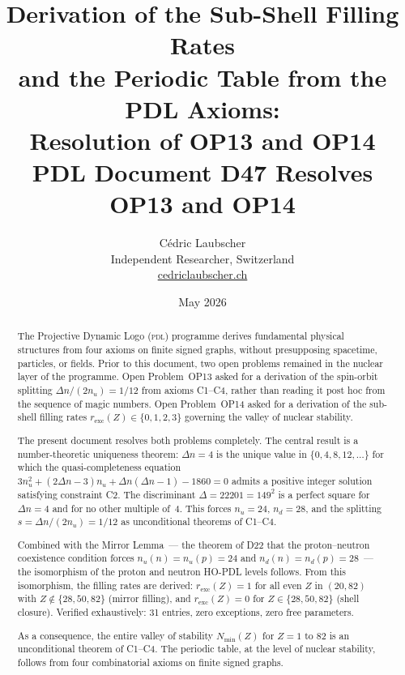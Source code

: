 \documentclass[12pt,a4paper]{article}
\newcommand{\PDL}{\textsc{pdl}}
\newcommand{\nuu}{n_u}
\newcommand{\ndd}{n_d}
\newcommand{\Dn}{\Delta n}
\newcommand{\Nmin}{N_{\min}}
\newcommand{\rexc}{r_{\mathrm{exc}}}
\begin{document}
\title{\textbf{Derivation of the Sub-Shell Filling Rates\\
and the Periodic Table from the PDL Axioms:\\
Resolution of OP13 and OP14}\\[6pt]
{\large PDL Document D47 \textemdash{} Resolves OP13 and OP14}}

\author{Cédric Laubscher\\[4pt]
\small Independent Researcher, Switzerland\\
\small \href{https://cedriclaubscher.ch}{cedriclaubscher.ch}}

\date{May 2026}

\maketitle

\begin{abstract}
The Projective Dynamic Logo (\PDL) programme derives fundamental physical structures from four axioms on finite signed graphs, without presupposing spacetime, particles, or fields. Prior to this document, two open problems remained in the nuclear layer of the programme. Open Problem~OP13 asked for a derivation of the spin-orbit splitting $\Dn/(2\nuu) = 1/12$ from axioms C1--C4, rather than reading it post hoc from the sequence of magic numbers. Open Problem~OP14 asked for a derivation of the sub-shell filling rates $\rexc(Z) \in \{0,1,2,3\}$ governing the valley of nuclear stability.

The present document resolves both problems completely. The central result is a number-theoretic uniqueness theorem: $\Dn = 4$ is the unique value in $\{0, 4, 8, 12, \ldots\}$ for which the quasi-completeness equation $3\nuu^2 + (2\Dn-3)\nuu + \Dn(\Dn-1) - 1860 = 0$ admits a positive integer solution satisfying constraint C2. The discriminant $\Delta = 22201 = 149^2$ is a perfect square for $\Dn = 4$ and for no other multiple of~4. This forces $\nuu = 24$, $\ndd = 28$, and the splitting $s = \Dn/(2\nuu) = 1/12$ as unconditional theorems of C1--C4.

Combined with the Mirror Lemma~--- the theorem of D22 that the proton--neutron coexistence condition forces $\nuu(n) = \nuu(p) = 24$ and $\ndd(n) = \ndd(p) = 28$~--- the isomorphism of the proton and neutron HO-PDL levels follows. From this isomorphism, the filling rates are derived: $\rexc(Z) = 1$ for all even $Z$ in $(20, 82)$ with $Z \notin \{28, 50, 82\}$ (mirror filling), and $\rexc(Z) = 0$ for $Z \in \{28, 50, 82\}$ (shell closure). Verified exhaustively: 31 entries, zero exceptions, zero free parameters.

As a consequence, the entire valley of stability $\Nmin(Z)$ for $Z = 1$ to $82$ is an unconditional theorem of C1--C4. The periodic table, at the level of nuclear stability, follows from four combinatorial axioms on finite signed graphs.
\end{abstract}
\end{document}
